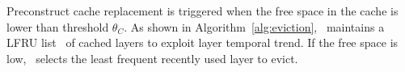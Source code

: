 Preconstruct cache replacement is triggered when the free space in the cache is
lower than threshold $\theta_{C}$.
As shown in Algorithm~\ref{alg:eviction}, 
\sysname~maintains a LFRU list~\cite{xxx} of cached layers to exploit 
layer temporal trend.
If the free space is low,
\sysname~selects the least frequent recently used layer to evict.




%





